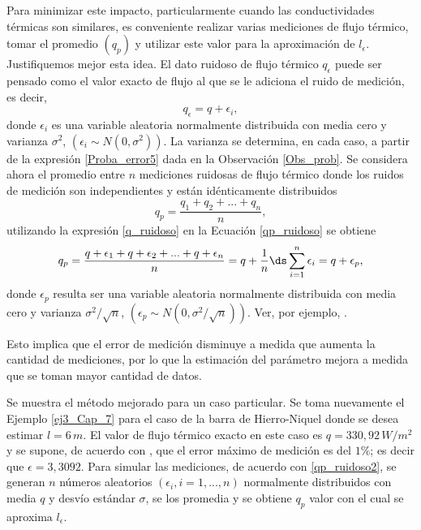 Para minimizar este impacto, particularmente cuando las conductividades t\'ermicas son similares, es conveniente realizar varias mediciones de flujo t\'ermico, 
tomar el promedio $(q_p)$ y utilizar este valor para la aproximaci\'on de $l_\epsilon$.
Justifiquemos mejor esta idea. El dato ruidoso de flujo t\'ermico $q_\epsilon$ puede ser pensado como el valor exacto de flujo al que se le adiciona el ruido de medici\'on, es decir,
%
\begin{equation}
\label{q_ruidoso}
q_\epsilon=q+\epsilon_i, 
\end{equation}
%
donde $\epsilon_i$ es una variable aleatoria normalmente distribuida con media cero y varianza $\sigma^2$, $\left(\epsilon_i \sim N(0,\sigma^2)\right)$. La varianza se determina, en cada caso, a partir de la expresi\'on \eqref{Proba_error5} dada en la Observaci\'on \ref{Obs_prob}. Se considera ahora el promedio entre $n$ mediciones ruidosas de flujo t\'ermico donde los ruidos de medici\'on son independientes y est\'an id\'enticamente distribuidos
%
\begin{equation}
\label{qp_ruidoso}
q_p=\dfrac{q_1+q_2+...+q_n}{n}, 
\end{equation}
%
utilizando la expresi\'on \eqref{q_ruidoso} en la Ecuaci\'on \eqref{qp_ruidoso} se obtiene
\vspace{-1.0cm}
\begin{equation}
\label{qp_ruidoso2}
q_p=\dfrac{q+\epsilon_1+q+\epsilon_2+...+q+\epsilon_n}{n}=q+\dfrac{1}{n}\ds \sum_{i=1}^{n}\epsilon_i =q+\epsilon_p, 
\end{equation}
%
donde $\epsilon_p$ resulta ser una variable aleatoria normalmente distribuida con media cero y varianza $\sigma^2/\sqrt{n}$, $\left(\epsilon_p \sim N(0,\sigma^2/\sqrt{n})\right)$. Ver, por ejemplo, \cite{Giri93,Rohatgi15}.

Esto implica que el error de medici\'on disminuye a medida que aumenta la cantidad de mediciones, por lo que la estimaci\'on del par\'ametro mejora a medida que se toman mayor cantidad de datos. 

Se muestra el m\'etodo mejorado para un caso particular. Se toma nuevamente el Ejemplo \ref{ej3_Cap_7} para el caso de la barra de Hierro-Niquel donde se desea estimar $l=6 \,m $.
El valor de flujo t\'ermico exacto en este caso es $q=330,92 \, W/m{^{2}}$ y se supone, de acuerdo con \cite{Danisman06,Kollie75,Pert01}, que el error m\'aximo de medici\'on es del $1 \%$; es decir que $\epsilon=3,3092$. 
Para simular las mediciones, de acuerdo con \eqref{qp_ruidoso2}, se generan $n$ n\'umeros aleatorios $(\epsilon_i, i=1,...,n)$ normalmente distribuidos con media $q$ y desv\'io est\'andar $\sigma$, se los promedia y se obtiene $q_p$ valor con el cual se aproxima $l_\epsilon$.
 

